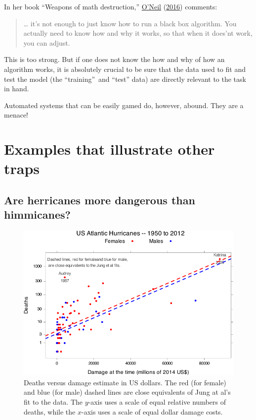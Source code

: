 \documentclass[
  10pt,
  b5paper]{book}
\begin{document}
In her book ``Weapons of math destruction,'' \protect\hyperlink{ref-oneil_2016}{O'Neil} (\protect\hyperlink{ref-oneil_2016}{2016})
comments:

\begin{quote}
\ldots{} it's not enough to just know how to run a black box
algorithm. You actually need to know how and why it works,
so that when it does'nt work, you can adjust.
\end{quote}

This is too strong. But if one does not know the how and
why of how an algorithm works, it is absolutely crucial to
be sure that the data used to fit and test the model
(the ``training''~and ``test'' data) are directly relevant to
the task in hand.

Automated systems that can be easily gamed do, however,
abound. They are a menace!

\hypertarget{examples-that-illustrate-other-traps}{%
\section{Examples that illustrate other traps}\label{examples-that-illustrate-other-traps}}

\hypertarget{are-herricanes-more-dangerous-than-himmicanes}{%
\subsection*{Are herricanes more dangerous than himmicanes?}\label{are-herricanes-more-dangerous-than-himmicanes}}

\begin{figure}[H]

{\centering \includegraphics[width=0.85\linewidth]{08-observational_files/figure-latex/hurricanes1-1} 

}

\caption{Deaths versus damage estimate in US dollars. The red (for female) 
and blue (for male) dashed lines are close equivalents of Jung at al's fit
to the data. The $y$-axis uses a scale of equal relative numbers of deaths, 
while the $x$-axis uses a scale of equal dollar damage costs.}\label{fig:hurricanes1}
\end{figure}
\end{document}
